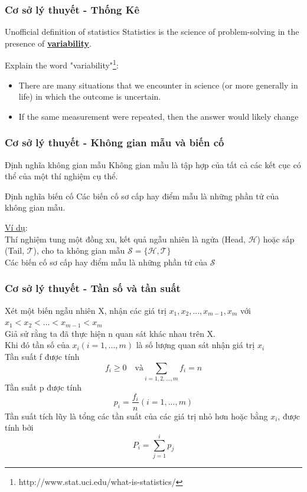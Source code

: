 \documentclass[t]{beamer}
\begin{document}

\begin{frame}
\frametitle{Cơ sở lý thuyết - Thống Kê}
\begin{block}{Unofficial definition of statistics}
Statistics is the science of problem-solving in the presence of \textbf{\underline{variability}}.
\end{block}
Explain the word "variability"\footnote{http://www.stat.uci.edu/what-is-statistics/}:
\begin{itemize}
\item There are many situations that we encounter in science (or more generally in life) in which the outcome is uncertain.
\item If the same measurement were repeated, then the answer would likely change
\end{itemize}
\end{frame}


\begin{frame}
\frametitle{Cơ sở lý thuyết - Không gian mẫu và biến cố}
\begin{block}{Định nghĩa không gian mẫu}
Không gian mẫu là tập hợp của tất cả các kết cục có thể của một thí nghiệm cụ thể.
\end{block}
\begin{block}{Định nghĩa biến cố}
Các biến cố sơ cấp hay điểm mẫu là những phần tử của không gian mẫu.
\end{block}
\underline{Ví dụ}:\\ 
Thí nghiệm tung một đồng xu, kết quả ngẫu nhiên là ngửa (Head, $\mathcal{H}$) hoặc sấp (Tail, $\mathcal{T}$), cho ta không gian mẫu $\mathcal{S= \{H,T}\}$\\
Các biến cố sơ cấp hay điểm mẫu là những phần tử của $\mathcal{S}$

\end{frame}


\begin{frame}[t]
\frametitle{Cơ sở lý thuyết - Tần số và tần suất}
Xét một biến ngẫu nhiên X, nhận các giá trị $x_1, x_2, ..., x_{m-1}, x_m$ với $x_1 < x_2 < ... < x_{m-1} < x_m$\\
Giả sử rằng ta đã thực hiện n quan sát khác nhau trên X.\\
Khi đó tần số của $x_i (i=1,...,m)$ là số lượng quan sát nhận giá trị $x_i$\\
Tần suất f được tính
\[
f_i \geq 0 \quad \text{và} \sum_{i=1,2,...,m} f_i=n
\]
Tần suất p được tính
\[
p_i=\frac{f_i}{n} (i=1,...,m)
\]
Tần suất tích lũy là tổng các tần suất của các giá trị nhỏ hơn hoặc bằng $x_i$, được tính bởi\\
\[
P_i = \sum_{j=1}^i p_j
\]
\end{frame}
\end{document}
